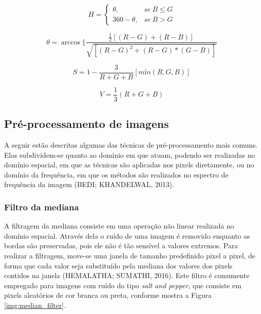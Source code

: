 \begin{equation} \label{eq:hsv1}
	H = \begin{cases}
			\theta, 		& se \ B \leq G \\
			360 - \theta, 	& se \ B > G
		\end{cases}
\end{equation}

\begin{equation} \label{eq:hsv2}
	\theta = \arccos{
		\Bigg\{ \frac{\frac{1}{2}[(R - G) + (R - B)]}{\sqrt{[(R - G)^2 + (R - G)*(G - B)]}}
	}
\end{equation}

\begin{equation} \label{eq:hsv3}
	S = 1 - \frac{3}{R + G + B}[mín(R,G,B)]
\end{equation}

\begin{equation} \label{eq:hsv4}
	V = \frac{1}{3}(R + G + B)
\end{equation}

\subsection{Pré-processamento de imagens}

A seguir estão descritas algumas das técnicas de pré-processamento mais comuns. Elas subdividem-se quanto ao domínio em que atuam, podendo ser realizadas no domínio espacial, em que as técnicas são aplicadas nos pixels diretamente, ou no domínio da frequência, em que os métodos são realizados no espectro de frequência da imagem (BEDI; KHANDELWAL, 2013). 

\subsubsection{Filtro da mediana}

A filtragem da mediana consiste em uma operação não linear realizada no domínio espacial. Através dela o ruído de uma imagem é removido enquanto as bordas são preservadas, pois ele não é tão sensível a valores extremos. Para realizar a filtragem, move-se uma janela de tamanho predefinido pixel a pixel, de forma que cada valor seja substituído pela mediana dos valores dos pixels contidos na janela (HEMALATHA; SUMATHI, 2016). Este filtro é comumente empregado para imagens com ruído do tipo \textit{salt and pepper}, que consiste em pixels aleatórios de cor branca ou preta, conforme mostra a Figura \ref{img:median_filter}.

